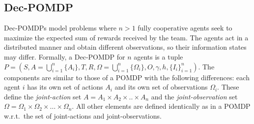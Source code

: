 \documentclass[letterpaper]{article}
\theoremstyle{definition}
\begin{document}
\subsection{Dec-POMDP}
Dec-POMDPs model problems where $n>1$ fully cooperative agents  seek to maximize the expected sum of rewards received by the team. The agents act in a distributed manner and obtain
different observations, so their information states may differ.
Formally, a Dec-POMDP for $n$ agents is a tuple  $P=(S, A=\bigcup_{i=1}^{n}{\{A_i\}}, T, R, \Omega=\bigcup_{i=1}^{n}{\{\Omega_i\}},  O, \gamma, h, {\{I_i\}}_{i=1}^{n})$. The components are similar to those of 
a POMDP with the following differences: each agent $i$ has its own
set of actions $A_i$ and its own set of observations $\Omega_i$. These define the {\em joint-action} set
$A=A_1 \times A_2 \times .. \times A_n$ and the 
{\em joint-observation} set $\Omega = \Omega_1 \times \Omega_2 \times
\ldots\times \Omega_n$. All other elements are defined identically as in a POMDP w.r.t.~the set of joint-actions and joint-observations.
%
\end{document}
